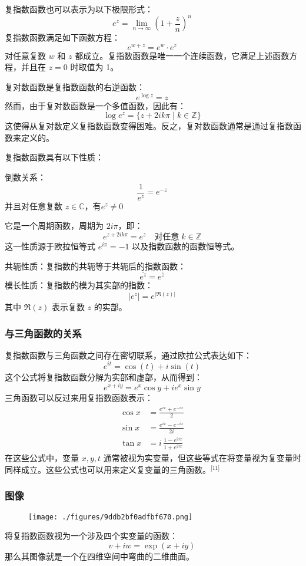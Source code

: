 复指数函数也可以表示为以下极限形式：
$$
e^z = \lim_{n \to \infty} \left(1 + \frac{z}{n} \right)^n~
$$
复指数函数满足如下函数方程：
$$
e^{w + z} = e^w \cdot e^z~
$$
对任意复数 $w$ 和 $z$ 都成立。复指数函数是唯一一个连续函数，它满足上述函数方程，并且在 $z = 0$ 时取值为 1。

复对数函数是复指数函数的右逆函数：
$$
e^{\log z} = z~
$$
然而，由于复对数函数是一个多值函数，因此有：
$$
\log e^z = \{ z + 2ik\pi \mid k \in \mathbb{Z} \}~
$$
这使得从复对数定义复指数函数变得困难。反之，复对数函数通常是通过复指数函数来定义的。

复指数函数具有以下性质：

倒数关系：
  $$
  \frac{1}{e^z} = e^{-z}~
  $$
并且对任意复数 $z \in \mathbb{C}$，有$e^z \neq 0$

它是一个周期函数，周期为 $2i\pi$，即：
  $$
  e^{z + 2ik\pi} = e^z \quad \text{对任意} \; k \in \mathbb{Z}~
  $$
这一性质源于欧拉恒等式 $e^{i\pi} = -1$ 以及指数函数的函数恒等式。

共轭性质：复指数的共轭等于共轭后的指数函数：
  $$
  \overline{e^z} = e^{\overline{z}}~
  $$
模长性质：复指数的模为其实部的指数：
  $$
  |e^z| = e^{|\Re(z)|}~
  $$
其中 $\Re(z)$ 表示复数 $z$ 的实部。
\subsubsection{与三角函数的关系}
复指数函数与三角函数之间存在密切联系，通过欧拉公式表达如下：
$$
e^{it} = \cos(t) + i\sin(t)~
$$
这个公式将复指数函数分解为实部和虚部，从而得到：
$$
e^{x + i y} = e^x \cos y + i e^x \sin y~
$$
三角函数可以反过来用复指数函数表示：
$$
\begin{aligned}
\cos x &= \frac{e^{ix} + e^{-ix}}{2} \\
\sin x &= \frac{e^{ix} - e^{-ix}}{2i} \\
\tan x &= i\,\frac{1 - e^{2ix}}{1 + e^{2ix}}
\end{aligned}~
$$
在这些公式中，变量 $x, y, t$ 通常被视为实变量，但这些等式在将变量视为复变量时同样成立。这些公式也可以用来定义复变量的三角函数。\(^\text{[11]}\)
\subsubsection{图像}
\begin{figure}[ht]
\centering
\texttt{[image: ./figures/9ddb2bf0adfbf670.png]}
\caption{} \label{fig_ZShs_6}
\end{figure}
将复指数函数视为一个涉及四个实变量的函数：
$$
v + iw = \exp(x + iy)~
$$
那么其图像就是一个在四维空间中弯曲的二维曲面。

